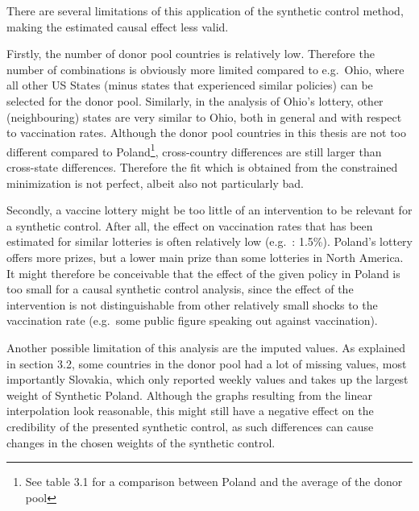 \documentclass{scrbook}
\begin{document}
There are several limitations of this application of the synthetic
control method, making the estimated causal effect less valid.

Firstly, the number of donor pool countries is relatively low. Therefore
the number of combinations is obviously more limited compared to
e.g.~Ohio, where all other US States (minus states that experienced
similar policies) can be selected for the donor pool. Similarly, in the
analysis of Ohio's lottery, other (neighbouring) states are very similar
to Ohio, both in general and with respect to vaccination rates. Although
the donor pool countries in this thesis are not too different compared
to
Poland\footnote{See table 3.1 for a comparison between Poland and the average of the donor pool},
cross-country differences are still larger than cross-state differences.
Therefore the fit which is obtained from the constrained minimization is
not perfect, albeit also not particularly bad.

Secondly, a vaccine lottery might be too little of an intervention to be
relevant for a synthetic control. After all, the effect on vaccination
rates that has been estimated for similar lotteries is often relatively
low (e.g.~\textcite{barber_conditional_2022}: 1.5\%). Poland's lottery
offers more prizes, but a lower main prize than some lotteries in North
America. It might therefore be conceivable that the effect of the given
policy in Poland is too small for a causal synthetic control analysis,
since the effect of the intervention is not distinguishable from other
relatively small shocks to the vaccination rate (e.g.~some public figure
speaking out against vaccination).

Another possible limitation of this analysis are the imputed values. As
explained in section 3.2, some countries in the donor pool had a lot of
missing values, most importantly Slovakia, which only reported weekly
values and takes up the largest weight of Synthetic Poland. Although the
graphs resulting from the linear interpolation look reasonable, this
might still have a negative effect on the credibility of the presented
synthetic control, as such differences can cause changes in the chosen
weights of the synthetic control.
\end{document}
